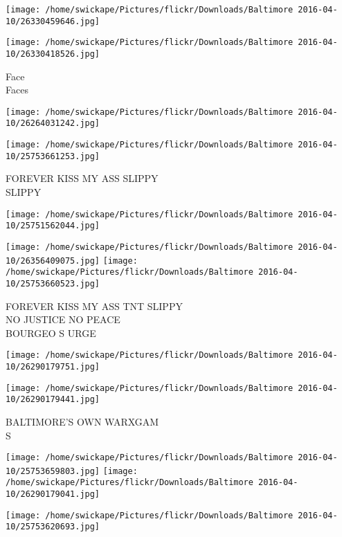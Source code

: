 \documentclass[10pt,letterpaper]{article}
\begin{document}
\texttt{[image: /home/swickape/Pictures/flickr/Downloads/Baltimore 2016-04-10/26330459646.jpg]}

\vspace{0.25in}
\texttt{[image: /home/swickape/Pictures/flickr/Downloads/Baltimore 2016-04-10/26330418526.jpg]}

Face\\
Faces\\
\pagebreak

\texttt{[image: /home/swickape/Pictures/flickr/Downloads/Baltimore 2016-04-10/26264031242.jpg]}

\vspace{0.25in}
\texttt{[image: /home/swickape/Pictures/flickr/Downloads/Baltimore 2016-04-10/25753661253.jpg]}

FOREVER KISS MY ASS SLIPPY\\
SLIPPY\\
\pagebreak

\texttt{[image: /home/swickape/Pictures/flickr/Downloads/Baltimore 2016-04-10/25751562044.jpg]}

\vspace{0.25in}
\texttt{[image: /home/swickape/Pictures/flickr/Downloads/Baltimore 2016-04-10/26356409075.jpg]}
\texttt{[image: /home/swickape/Pictures/flickr/Downloads/Baltimore 2016-04-10/25753660523.jpg]}

FOREVER KISS MY ASS TNT SLIPPY\\
NO JUSTICE NO PEACE\\
BOURGEO S URGE\\
\pagebreak

\texttt{[image: /home/swickape/Pictures/flickr/Downloads/Baltimore 2016-04-10/26290179751.jpg]}

\vspace{0.25in}
\texttt{[image: /home/swickape/Pictures/flickr/Downloads/Baltimore 2016-04-10/26290179441.jpg]}

BALTIMORE'S OWN WARXGAM\\
S\\
\pagebreak

\texttt{[image: /home/swickape/Pictures/flickr/Downloads/Baltimore 2016-04-10/25753659803.jpg]}
\texttt{[image: /home/swickape/Pictures/flickr/Downloads/Baltimore 2016-04-10/26290179041.jpg]}

\vspace{0.25in}
\texttt{[image: /home/swickape/Pictures/flickr/Downloads/Baltimore 2016-04-10/25753620693.jpg]}
\end{document}
